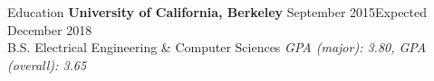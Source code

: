\documentclass{resume} %
\begin{document}




\begin{rSection}{Education}
{\bf University of California, Berkeley} \hfill {September 2015\textminus Expected December 2018} \\ 
B.S. Electrical Engineering \& Computer Sciences \hfill {\em GPA (major): 3.80, GPA (overall): 3.65}
\end{rSection}

\end{document}
